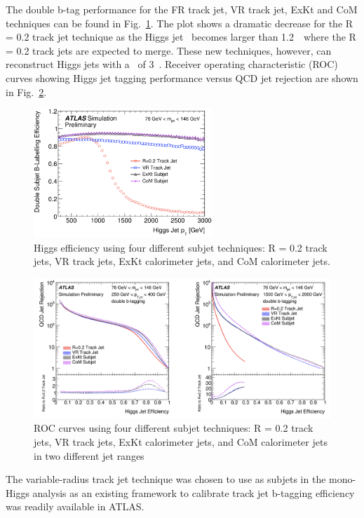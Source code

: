 \par The double b-tag performance for the FR track jet, VR track jet, ExKt and CoM techniques can be found in Fig.~\ref{fig:higgs_pt}.
The plot shows a dramatic decrease for the R = 0.2 track jet technique as the Higgs jet \pt~becomes larger than 1.2~\TeV~where the 
R = 0.2 track jets are expected to merge. These new techniques, however, can reconstruct Higgs jets with a \pt~of 3~\TeV. Receiver operating characteristic (ROC) curves showing Higgs jet tagging performance versus 
QCD jet rejection are shown in Fig.~\ref{fig:higgs_ROC}.

\begin{figure}[htbp]
    \centering
    \includegraphics[width=0.6\textwidth]{chapters/c5/figures/higgs_pt}
    \caption{Higgs efficiency using four different subjet techniques: R = 0.2 track jets, VR track jets, ExKt calorimeter jets, and CoM calorimeter jets.}
    \label{fig:higgs_pt}
\end{figure}

\begin{figure}[htbp]
    \centering
    \includegraphics[width=1\textwidth]{chapters/c5/figures/higgs_ROC}
    \caption{ROC curves using four different subjet techniques: R = 0.2 track jets, VR track jets, ExKt calorimeter jets, and CoM calorimeter jets in two different jet \pt ranges}
    \label{fig:higgs_ROC}
\end{figure}

\par The variable-radius track jet technique was chosen to use as subjets in the mono-Higgs analysis as an existing framework to calibrate track jet b-tagging efficiency was readily available in ATLAS.
